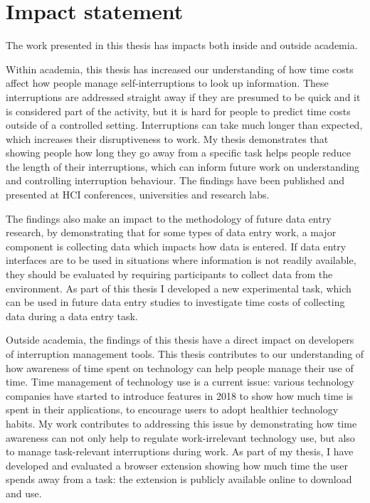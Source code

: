 \section*{Impact statement}

The work presented in this thesis has impacts both inside and outside academia. 

Within academia, this thesis has increased our understanding of how time costs affect how people manage self-interruptions to look up information. These interruptions are addressed straight away if they are presumed to be quick and it is considered part of the activity, but it is hard for people to predict time costs outside of a controlled setting. Interruptions can take much longer than expected, which increases their disruptiveness to work. My thesis demonstrates that showing people how long they go away from a specific task helps people reduce the length of their interruptions, which can inform future work on understanding and controlling interruption behaviour. The findings have been published and presented at HCI conferences, universities and research labs. 

The findings also make an impact to the methodology of future data entry research, by demonstrating that for some types of data entry work, a major component is collecting data which impacts how data is entered. If data entry interfaces are to be used in situations where information is not readily available, they should be evaluated  by requiring participants to collect data from the environment. As part of this thesis I developed a new experimental task, which can be used in future data entry studies to investigate time costs of collecting data during a data entry task.

Outside academia, the findings of this thesis have a direct impact on developers of interruption management tools. This thesis contributes to our understanding of how awareness of time spent on technology can help people manage their use of time. Time management of technology use is a current issue: various technology companies have started to introduce features in 2018 to show how much time is spent in their applications, to encourage users to adopt healthier technology habits. My work contributes to addressing this issue by demonstrating how time awareness can not only help to regulate work-irrelevant technology use, but also to manage task-relevant interruptions during work. As part of my thesis, I have developed and evaluated a browser extension showing how much time the user spends away from a task: the extension is publicly available online to download and use. 